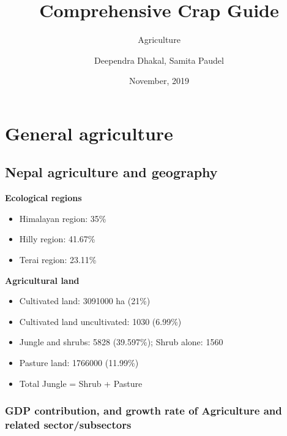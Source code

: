 \documentclass[
  openany]{book}
\title{Comprehensive Crap Guide}
\subtitle{Agriculture}
\author{Deependra Dhakal, Samita Paudel}
\date{November, 2019}
\providecommand{\tightlist}{%
  \setlength{\itemsep}{0pt}\setlength{\parskip}{0pt}}
\begin{document}
\maketitle

{
\setcounter{tocdepth}{1}
\tableofcontents
}
\hypertarget{general-agriculture}{%
\chapter{General agriculture}\label{general-agriculture}}

\hypertarget{nepal-agriculture-and-geography}{%
\section{Nepal agriculture and geography}\label{nepal-agriculture-and-geography}}

\textbf{Ecological regions}

\begin{itemize}
\tightlist
\item
  Himalayan region: 35\%
\item
  Hilly region: 41.67\%
\item
  Terai region: 23.11\%
\end{itemize}

\textbf{Agricultural land}

\begin{itemize}
\tightlist
\item
  Cultivated land: 3091000 ha (21\%)
\item
  Cultivated land uncultivated: 1030 (6.99\%)
\item
  Jungle and shrubs: 5828 (39.597\%); Shrub alone: 1560
\item
  Pasture land: 1766000 (11.99\%)
\item
  Total Jungle = Shrub + Pasture
\end{itemize}

\hypertarget{gdp-contribution-and-growth-rate-of-agriculture-and-related-sectorsubsectors}{%
\subsection{GDP contribution, and growth rate of Agriculture and related sector/subsectors}\label{gdp-contribution-and-growth-rate-of-agriculture-and-related-sectorsubsectors}}

\begingroup\fontsize{8}{10}\selectfont
\end{document}
